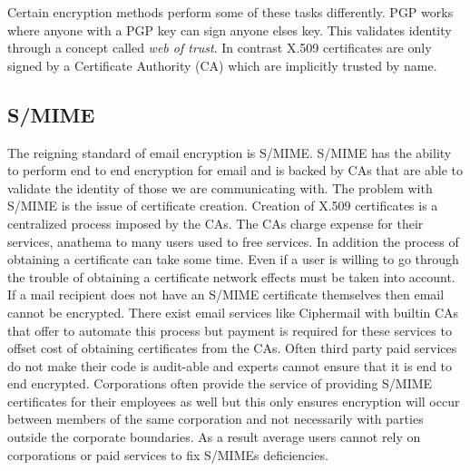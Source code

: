\documentclass[10pt]{article}
\begin{document}
\begin{multicols}{2}
Certain encryption methods perform some of these tasks differently. PGP works where anyone with a PGP key can sign anyone elses key. This validates identity through a concept called \textit{web of trust}. In contrast X.509 certificates are only signed by a Certificate Authority (CA) which are implicitly trusted by name.

\subsection{S/MIME}
\par The reigning standard of email encryption is S/MIME. S/MIME has the ability to perform end to end encryption for email and is backed by CAs that are able to validate the identity of those we are communicating with. The problem with S/MIME is the issue of certificate creation. Creation of X.509 certificates is a centralized process imposed by the CAs\cite{garfinkel2005johnny}. The CAs charge expense for their services, anathema to many users used to free services. In addition the process of obtaining a certificate can take some time. Even if a user is willing to go through the trouble of obtaining a certificate network effects must be taken into account. If a mail recipient does not have an S/MIME certificate themselves then email cannot be encrypted. There exist email services like Ciphermail with builtin CAs \cite{ciphermail-gateway} that offer to automate this process but payment is required for these services to offset cost of obtaining certificates from the CAs. Often third party paid services do not make their code is audit-able and experts cannot ensure that it is end to end encrypted. Corporations often provide the service of providing S/MIME certificates for their employees as well but this only ensures encryption will occur between members of the same corporation and not necessarily with parties outside the corporate boundaries. As a result average users cannot rely on corporations or paid services to fix S/MIMEs deficiencies.

\end{multicols}
\end{document}

